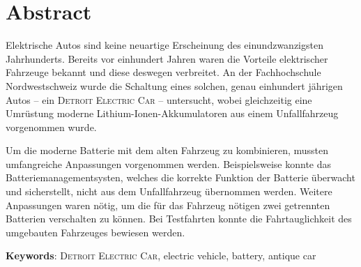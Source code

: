 \chapter*{Abstract}\color{blue}
Elektrische Autos sind keine neuartige Erscheinung des einundzwanzigsten Jahrhunderts. Bereits vor einhundert Jahren waren die Vorteile elektrischer Fahrzeuge bekannt und diese deswegen verbreitet. An der Fachhochschule Nordwestschweiz wurde die Schaltung eines solchen, genau einhundert jährigen Autos -- ein \textsc{Detroit Electric Car} -- untersucht, wobei gleichzeitig eine Umrüstung moderne Lithium-Ionen-Akkumulatoren aus einem Unfallfahrzeug vorgenommen wurde.

Um die moderne Batterie mit dem alten Fahrzeug zu kombinieren, mussten umfangreiche Anpassungen vorgenommen werden. Beispielsweise konnte das Batteriemanagementsysten, welches die korrekte Funktion der Batterie überwacht und sicherstellt, nicht aus dem Unfallfahrzeug übernommen werden. Weitere Anpassungen waren nötig, um die für das Fahrzeug nötigen zwei getrennten Batterien verschalten zu können. Bei Testfahrten konnte die Fahrtauglichkeit des umgebauten Fahrzeuges bewiesen werden.\color{black}

\textbf{Keywords}: \textsc{Detroit Electric Car}, electric vehicle, battery, antique car
